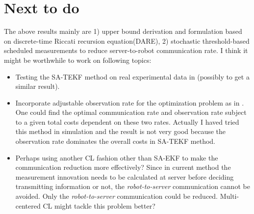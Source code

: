 \documentclass[conference]{IEEEtran}
\begin{document}
\section{Next to do}
The above results mainly are 1) upper bound derivation and formulation based on discrete-time Riccati recursion equation(DARE), 2) stochastic threshold-based scheduled measurements to reduce server-to-robot communication rate.
I think it might be worthwhile to work on following topics:
\begin{itemize}
	\item Testing the SA-TEKF method on real experimental data in \cite{leung2011utias} (possibly to get a similar result).
	\item Incorporate adjustable observation rate for the optimization problem as in \cite{mourikis2006optimal}.
	One could find the optimal communication rate and observation rate subject to a given total costs dependent on these two rates.
	Actually I haved tried this method in simulation and the result is not very good because the observation rate dominates the overall costs in SA-TEKF method.
	\item Perhaps using another CL fashion other than SA-EKF to make the communication reduction more effectively?
	Since in current method the measurement innovation needs to be calculated at server before deciding transmitting information or not, the \emph{robot-to-server} communication cannot be avoided.
	Only the \emph{robot-to-server} communication could be reduced.
	Multi-centered CL might tackle this problem better?
\end{itemize}



\end{document}
